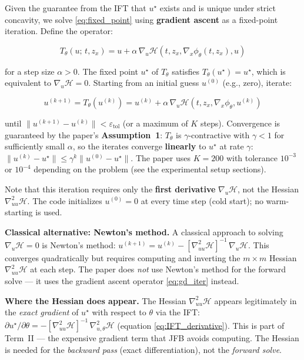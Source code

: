 \documentclass{article}
\begin{document}
\begin{compnumissuesbox}
Given the guarantee from the IFT that $u^\star$ exists and is unique under
strict concavity, we solve \eqref{eq:fixed_point} using \textbf{gradient ascent}
as a fixed-point iteration. Define the operator:

\begin{equation}
    T_\theta(u;\, t, z_x)
    = u + \alpha\, \nabla_u \mathcal{H}(t, z_x, \nabla_x\phi_\theta(t, z_x), u)
    \label{eq:fixed_point_iter}
\end{equation}

for a step size $\alpha > 0$. The fixed point $u^\star$ of $T_\theta$ satisfies
$T_\theta(u^\star) = u^\star$, which is equivalent to $\nabla_u \mathcal{H}
= 0$. Starting from an initial guess $u^{(0)}$ (e.g., zero), iterate:

\begin{equation}
    u^{(k+1)} = T_\theta(u^{(k)}) = u^{(k)}
    + \alpha\, \nabla_u \mathcal{H}(t, z_x, \nabla_x\phi_\theta, u^{(k)})
    \label{eq:gd_iter}
\end{equation}

until $\|u^{(k+1)} - u^{(k)}\| < \varepsilon_{\text{tol}}$ (or a maximum of $K$
steps). Convergence is guaranteed by the paper's \textbf{Assumption~1}:
$T_\theta$ is $\gamma$-contractive with $\gamma < 1$ for sufficiently small
$\alpha$, so the iterates converge \textbf{linearly} to $u^\star$ at rate
$\gamma$:
$\|u^{(k)} - u^\star\| \leq \gamma^k \|u^{(0)} - u^\star\|$.
The paper uses $K = 200$ with tolerance $10^{-3}$ or $10^{-4}$ depending on
the problem (see the experimental setup sections).

Note that this iteration requires only the \textbf{first derivative}
$\nabla_u \mathcal{H}$, not the Hessian $\nabla^2_{uu}\mathcal{H}$. The code
initializes $u^{(0)} = 0$ at every time step (cold start); no warm-starting
is used.

\textbf{Classical alternative: Newton's method.} A classical approach to solving
$\nabla_u \mathcal{H} = 0$ is Newton's method:
$u^{(k+1)} = u^{(k)} - [\nabla^2_{uu}\mathcal{H}]^{-1}\, \nabla_u \mathcal{H}$.
This converges quadratically but requires computing and inverting the $m \times m$
Hessian $\nabla^2_{uu}\mathcal{H}$ at each step. The paper does \textit{not} use
Newton's method for the forward solve --- it uses the gradient ascent operator
\eqref{eq:gd_iter} instead.

\textbf{Where the Hessian does appear.} The Hessian $\nabla^2_{uu}\mathcal{H}$
appears legitimately in the \textit{exact gradient} of $u^\star$ with respect to
$\theta$ via the IFT: $\partial u^\star / \partial\theta = -[\nabla^2_{uu}
\mathcal{H}]^{-1}\, \nabla^2_{u,\theta}\mathcal{H}$ (equation
\eqref{eq:IFT_derivative}). This is part of Term~II --- the expensive gradient
term that JFB avoids computing. The Hessian is needed for the \textit{backward
pass} (exact differentiation), not the \textit{forward solve}.


\end{compnumissuesbox}
\end{document}
